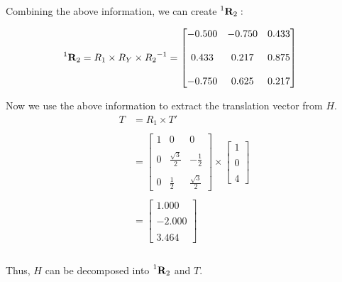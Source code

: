 \documentclass[12pt, oneside]{article}
\begin{document}
Combining the above information, we can create $ \prescript{1}{}{\mathbf{R}_2}:$

\begin{align*}
    & \prescript{1}{}{\mathbf{R}_2} 
    =  R_1 \times R_Y \times {R_2}^{-1}
    = \begin{bmatrix} -0.500  & -0.750 & 0.433 \\ \\ 
                    0.433   & 0.217 & 0.875 \\ \\ 
                    -0.750   & 0.625 & 0.217 \end{bmatrix} 
\end{align*}

Now we use the above information to extract the translation vector from $H$.
\begin{align*}
    T   &= R_1 \times T' \\ \\
        &=  \begin{bmatrix} 1 & 0 & 0 \\ \\ 
            0 & \frac{\sqrt{3}}{2} & -\frac{1}{2}\\ \\ 
            0 & \frac{1}{2} & \frac{\sqrt{3}}{2} \end{bmatrix}  \times
            \begin{bmatrix} 1  \\ \\ 
                0 \\ \\ 
                4 \end{bmatrix}  \\ \\
        &=  \begin{bmatrix} 1.000  \\ \\ 
                -2.000 \\ \\ 
                3.464 \end{bmatrix}  \\ \\
\end{align*}

Thus, $H$ can be decomposed into  $ \prescript{1}{}{\mathbf{R}_2}$ and $T$.
\end{document}
